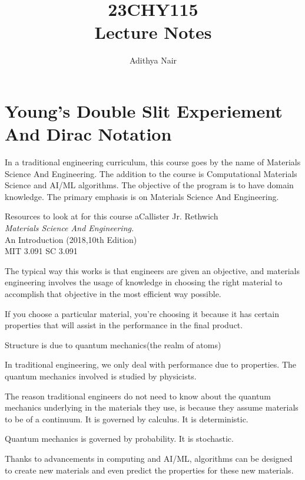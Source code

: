 \documentclass{report}
\title{\Huge{23CHY115}\\Lecture Notes}
\author{\huge{Adithya Nair}}
\date{}
\begin{document}
\maketitle
\newpage%
\chapter{Young's Double Slit Experiement And Dirac Notation} %

\createintro

In a traditional engineering curriculum, this course goes by the name of Materials Science And Engineering. The addition to the course is Computational Materials Science and AI/ML algorithms. The objective of the program is to have domain knowledge. The primary emphasis is on Materials Science And Engineering.
\begin{Reference}{Resources to look at for this course}
aCallister Jr. Rethwich \\
\textit{Materials Science And Engineering.}  \\
An Introduction (2018,10th Edition) \\
MIT 3.091 SC
3.091
\end{Reference}
The typical way this works is that engineers are given an objective, and materials engineering involves the usage of knowledge in choosing the right material to accomplish that objective in the most efficient way possible.

If you choose a particular material, you're choosing it because it has certain properties that will assist in the performance in the final product.


Structure is due to quantum mechanics(the realm of atoms)


In traditional engineering, we only deal with performance due to properties. The quantum mechanics involved is studied by physicists.

The reason traditional engineers do not need to know about the quantum mechanics underlying in the materials they use, is because they assume materials to be of a continuum. It is governed by calculus. It is deterministic.

Quantum mechanics is governed by probability. It is stochastic.

Thanks to advancements in computing and AI/ML, algorithms can be designed to create new materials and even predict the properties for these new materials.
\end{document}
